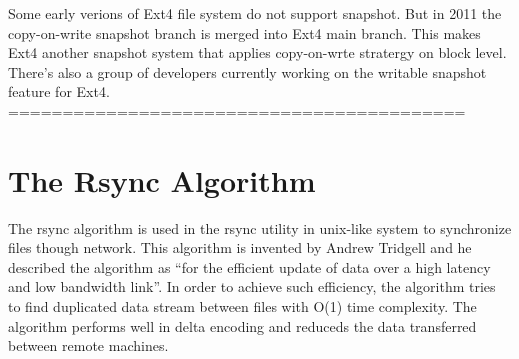     Some early verions of Ext4 file system do not support snapshot. But in 2011 the copy-on-write snapshot branch is merged into Ext4 main branch. This makes Ext4 another snapshot system that applies copy-on-wrte stratergy on block level. There's also a group of developers currently working on the writable snapshot feature for Ext4.
    ==========================================
\section{The Rsync Algorithm}
    
    The rsync algorithm is used in the rsync utility in unix-like system to synchronize files though network. This algorithm is invented by Andrew Tridgell and he described the algorithm as ``for the efficient update of data over a high latency and low bandwidth link''. In order to achieve such efficiency, the algorithm tries to find duplicated data stream between files with O(1) time complexity. The algorithm performs well in delta encoding and reduceds the data transferred between remote machines.
